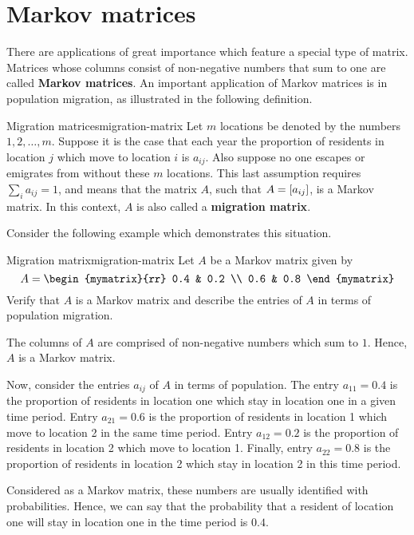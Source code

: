 \section{Markov matrices}

There are applications of great importance which feature a special type of matrix.  Matrices whose columns consist of non-negative numbers that sum to one are
called \textbf{Markov matrices}. An important application of Markov matrices is
in population migration, as illustrated in the following definition. 

\begin{definition}{Migration matrices}{migration-matrix}
Let $m$ locations be denoted by the numbers $1,2,\ldots,m$. Suppose
it is the case that each year the proportion of residents in location
$j$ which move to location $i$ is $a_{ij}$. Also suppose no one
escapes or emigrates from without these $m$ locations. This last
assumption requires $\sum_{i}a_{ij}=1$, and means that the matrix $A$,
such that $A = \left[a_{ij} \right]$, is a Markov matrix. In this context,
$A$ is also called a \textbf{migration matrix}.
\end{definition}

Consider the following example which demonstrates this situation.

\begin{example}{Migration matrix}{migration-matrix}
Let $A$ be a Markov matrix given by 
\begin{equation*}
A = 
\begin{mymatrix}{rr}
0.4 & 0.2 \\
0.6 & 0.8
\end{mymatrix}
\end{equation*}
Verify that $A$ is a Markov matrix and describe the entries of $A$ in terms of population migration.
\end{example}

\begin{solution}
The columns of $A$ are comprised of non-negative numbers which sum to $1$. Hence, $A$ is a Markov matrix. 

Now, consider the entries $a_{ij}$ of $A$ in terms of population. The
entry $a_{11} = 0.4$ is the proportion of residents in location one
which stay in location one in a given time period.  Entry $a_{21} =
0.6$ is the proportion of residents in location 1 which move to
location 2 in the same time period. Entry $a_{12} = 0.2$ is the
proportion of residents in location 2 which move to location
1. Finally, entry $a_{22} = 0.8$ is the proportion of residents in
location 2 which stay in location 2 in this time period.  

Considered as a Markov matrix, these numbers are usually identified
with probabilities. Hence, we can say that the probability that a
resident of location one will stay in location one in the time period
is $0.4$.
\end{solution}


